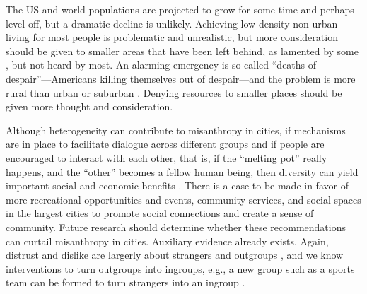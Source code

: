\documentclass[11pt, letterpaper]{article}
\begin{document}
\begin{spacing}{1.4}

The US and world populations are projected to grow for some time and perhaps
level off, but a dramatic decline is unlikely. Achieving low-density non-urban
living for most people is problematic and unrealistic, but more consideration
should be given to smaller areas that have been left behind, as lamented by some
\citep[e.g.,][]{fullerNYT17monD,hansonCityJournalautumn15}, but not heard by
most.
 An alarming emergency is so called ``deaths of despair''---Americans killing
 themselves out of despair---and the problem is more rural than urban or
 suburban \citep{case15,case20}.
Denying resources to smaller places should be given more thought and consideration.
 
Although heterogeneity can contribute to misanthropy in cities, if mechanisms
are in place to facilitate dialogue across different groups and if people are
encouraged to interact with each other, that is, if the ``melting pot'' really
happens, and the ``other'' becomes a fellow human being, then diversity can
yield important social and economic benefits \citep{rodriguez2019does}.  
There is a case to be made in favor of more recreational opportunities and
events, community services, and social spaces in the largest cities to promote
social connections and create a sense of community.  Future research should
determine whether these recommendations can curtail misanthropy in
cities. Auxiliary evidence already exists. Again, distrust and dislike are largerly about
strangers and outgroups \citep{wilson85, delhey11}, and we know interventions to
turn outgroups into ingroups, e.g., a new group such as a sports team can be
 formed to turn strangers into an ingroup \citep[e.g.,][]{smith10}.


\end{spacing}
\end{document}
